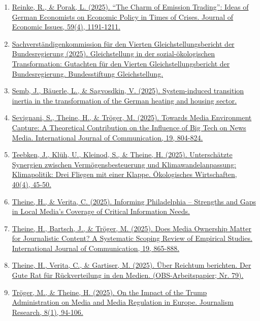\begin{enumerate}
	 \item \href{https://doi.org/10.1080/00213624.2025.2575141}{Reinke, R., \& Porak, L. (2025). “The Charm of Emission Trading”: Ideas of German Economists on Economic Policy in Times of Crises. Journal of Economic Issues, 59(4), 1191-1211.}
	 \item \href{https://www.gleichstellungsbericht.de/wp-content/uploads/2025/04/GutachtenVierterGleichstellungsbericht_WEB_20250303_bf_V2.pdf}{Sachverständigenkommission für den Vierten Gleichstellungsbericht der Bundesregierung (2025). Gleichstellung in der sozial-ökologischen Transformation: Gutachten für den Vierten Gleichstellungsbericht der Bundesregierung. Bundesstiftung Gleichstellung.}
	 \item \href{https://doi.org/10.2139/ssrn.5406252}{Semb, J., Bäuerle, L., \& Sagvosdkin, V. (2025). System-induced transition inertia in the transformation of the German heating and housing sector.}
	 \item \href{https://ijoc.org/index.php/ijoc/article/download/21987/4921}{Sevignani, S., Theine, H., \& Tröger, M. (2025). Towards Media Environment Capture: A Theoretical Contribution on the Influence of Big Tech on News Media. International Journal of Communication, 19, 804-824.}
	 \item \href{https://doi.org/10.14512/OEW400445}{Teebken, J., Klüh, U., Kleinod, S., \& Theine, H. (2025). Unterschätzte Synergien zwischen Vermögensbesteuerung und Klimawandelanpassung: Klimapolitik: Drei Fliegen mit einer Klappe. Ökologisches Wirtschaften, 40(4), 45-50.}
	 \item \href{https://www.asc.upenn.edu/sites/default/files/2025-09/Informing%20Philadelphia%20White%20Paper.pdf}{Theine, H., \& Verita, C. (2025). Informing Philadelphia -- Strengths and Gaps in Local Media’s Coverage of Critical Information Needs.}
	 \item \href{https://ijoc.org/index.php/ijoc/article/download/21986/4924}{Theine, H., Bartsch, J., \& Tröger, M. (2025). Does Media Ownership Matter for Journalistic Content? A Systematic Scoping Review of Empirical Studies. International Journal of Communication, 19, 865-888.}
	 \item \href{https://www.otto-brenner-stiftung.de/was-wir-tun/publikationen/ueber-reichtum-berichten/}{Theine, H., Verita, C., \& Gartiser, M. (2025). Über Reichtum berichten. Der \glqq Gute Rat für Rückverteilung\grqq{} in den Medien. (OBS-Arbeitspapier; Nr. 79).}
	 \item \href{https://doi.org/10.1453/2569-152X-12025-15004-en}{Tröger, M., \& Theine, H. (2025). On the Impact of the Trump Administration on Media and Media Regulation in Europe. Journalism Research, 8(1), 94-106.}

\end{enumerate}
